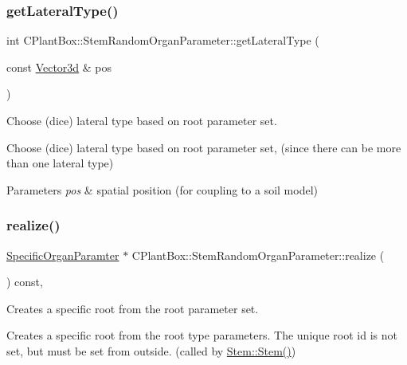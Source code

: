 \subsubsection{\texorpdfstring{get\+Lateral\+Type()}{getLateralType()}}
{\footnotesize\ttfamily int C\+Plant\+Box\+::\+Stem\+Random\+Organ\+Parameter\+::get\+Lateral\+Type (\begin{DoxyParamCaption}\item[{const \hyperlink{classCPlantBox_1_1Vector3d}{Vector3d} \&}]{pos }\end{DoxyParamCaption})}



Choose (dice) lateral type based on root parameter set. 

Choose (dice) lateral type based on root parameter set, (since there can be more than one lateral type)


\begin{DoxyParams}{Parameters}
{\em pos} & spatial position (for coupling to a soil model) \\
\hline
\end{DoxyParams}
\mbox{\label{classCPlantBox_1_1StemRandomOrganParameter_a85f065cc05841ede1bbad76065988dfb}} 
\subsubsection{\texorpdfstring{realize()}{realize()}}
{\footnotesize\ttfamily \hyperlink{classCPlantBox_1_1SpecificOrganParamter}{Specific\+Organ\+Paramter} $\ast$ C\+Plant\+Box\+::\+Stem\+Random\+Organ\+Parameter\+::realize (\begin{DoxyParamCaption}{ }\end{DoxyParamCaption}) const\hspace{0.3cm}{\ttfamily [override]}, {\ttfamily [virtual]}}



Creates a specific root from the root parameter set. 

Creates a specific root from the root type parameters. The unique root id is not set, but must be set from outside. (called by \hyperlink{classCPlantBox_1_1Stem_a6ae67c6b507172aae16733c79a9322a3}{Stem\+::\+Stem()})

